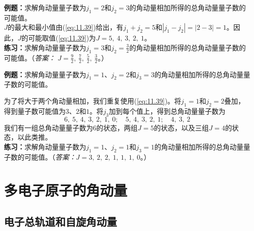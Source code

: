     \begin{examplebox}
        \textbf{例题：}求解角动量量子数为$j_1 = 2$和$j_2 = 3$的角动量相加所得的总角动量量子数的可能值。
        \\

        $J$的最大和最小值由(\ref{eq:11.39})给出，有$j_1 + j_2 = 5$和$\left| j_1 - j_2 \right| = \left|2-3\right| = 1$。因此，$J$的可能取值(\ref{eq:11.39})为$J = 5,\:4,\:3,\:2,\:1$。
        \\

        \textbf{练习：}求解角动量量子数为$j_1 = 3$和$j_2 = \frac{3}{2}$的角动量相加所得的总角动量量子数的可能值。（\textit{答案：} $J = \frac{9}{2}, \: \frac{7}{2}, \: \frac{5}{2}, \: \frac{3}{2}$。）
    \end{examplebox}
    \begin{examplebox}
        \textbf{例题：}求解角动量量子数为$j_1 = 1$、$j_2 = 2$和$j_3 = 3$的角动量相加所得的总角动量量子数的可能值。

        为了将大于两个角动量相加，我们重复使用(\ref{eq:11.39})。将$j_1=1$和$j_2=2$叠加，得到量子数可能值为$3$、$2$和$1$。将$j_3$加到每个值上，得到总角动量量子数为
        \begin{equation}
            6,\:5,\:4,\:3,\:2,\:1,\:0; \quad 5,\:4,\:3,\:2,\:1; \quad 4,\:3,\:2
            \label{eq:11.40}
        \end{equation}
        我们有一组总角动量量子数为$6$的状态，两组$J=5$的状态，以及三组$J=4$的状态，以此类推。
        \\

        \textbf{练习：}求解角动量量子数为$j_1 = 1$、$j_2 = 1$和$j_3 = 1$的角动量相加所得的总角动量量子数的可能值。（\textit{答案：}$J = 3,\:2,\:2,\:1,\:1,\:1,\:0$。）
    \end{examplebox}

\section{多电子原子的角动量}
\label{sec:11.5 Angular momentum in Many-Electron Atoms}

\subsection*{电子总轨道和自旋角动量}

